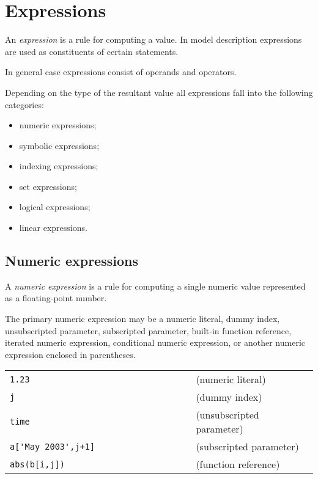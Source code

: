 \documentclass[11pt]{report}
\def\para#1{\noindent{\bf#1}}
\begin{document}

\newpage

\chapter{Expressions}

An {\it expression} is a rule for computing a value. In model
description expressions are used as constituents of certain statements.

In general case expressions consist of operands and operators.

Depending on the type of the resultant value all expressions fall into
the following categories:

\vspace*{-8pt}

\begin{itemize}
\item numeric expressions;
\item symbolic expressions;
\item indexing expressions;
\item set expressions;
\item logical expressions;
\item linear expressions.
\end{itemize}

\vspace*{-8pt}

\section{Numeric expressions}

A {\it numeric expression} is a rule for computing a single numeric
value represented as a floating-point number.

The primary numeric expression may be a numeric literal, dummy index,
unsubscripted parameter, subscripted parameter, built-in function
reference, iterated numeric expression, conditional numeric expression,
or another numeric expression enclosed in parentheses.

\para{Examples}

\noindent
\begin{tabular}{@{}ll@{}}
\verb|1.23                                |&(numeric literal)\\
\verb|j|&(dummy index)\\
\verb|time|&(unsubscripted parameter)\\
\verb|a['May 2003',j+1]|&(subscripted parameter)\\
\verb|abs(b[i,j])|&(function reference)\\
\end{tabular}
\end{document}
